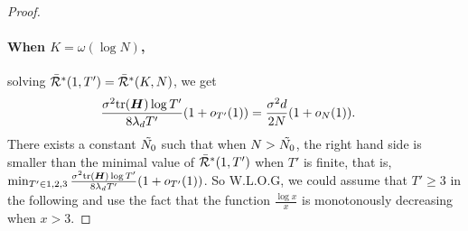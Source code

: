 \begin{proof}
\paragraph{When $K = \omega(\log N)$,}solving $\Bar{\mathcal{R}}^*(1,T')=\Bar{\mathcal{R}}^*(K, N)$, we get 
\begin{align}
    &\frac{\sigma^2\mathrm{tr}({\bm{H}})\log T'}{8\lambda_dT'}(1+o_{T'}(1))=\frac{\sigma^2d}{2N}(1+o_N(1)). \label{equ:K-large-solve}
\end{align}
There exists a constant $\Tilde{N_0}$ such that when $N>\Tilde{N_0}$, the right hand side is smaller than the minimal value of $\Bar{\mathcal{R}}^*(1,T')$ when $T'$ is finite, that is, $\min_{T'\in{1, 2, 3}}\frac{\sigma^2\mathrm{tr}({\bm{H}})\log T'}{8\lambda_dT'}(1+o_{T'}(1))$. So W.L.O.G, we could assume that $T'\geq 3$ in the following and use the fact that the function $\frac{\log x}{x}$ is monotonously decreasing when $x > 3$.


\end{proof}
